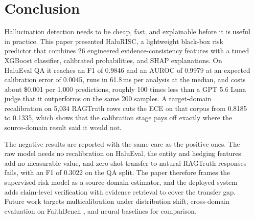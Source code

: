 \section{Conclusion}

Hallucination detection needs to be cheap, fast, and explainable before it is useful in practice. This paper presented HaluRISC, a lightweight black-box risk predictor that combines 26 engineered evidence-consistency features with a tuned XGBoost classifier, calibrated probabilities, and SHAP explanations. On HaluEval QA it reaches an F1 of 0.9846 and an AUROC of 0.9979 at an expected calibration error of 0.0045, runs in 61.8\,ms per analysis at the median, and costs about \$0.001 per 1{,}000 predictions, roughly 100 times less than a GPT 5.6 Luna judge that it outperforms on the same 200 samples. A target-domain recalibration on 5{,}034 RAGTruth rows cuts the ECE on that corpus from 0.8185 to 0.1335, which shows that the calibration stage pays off exactly where the source-domain result said it would not.

The negative results are reported with the same care as the positive ones. The raw model needs no recalibration on HaluEval, the entity and hedging features add no measurable value, and zero-shot transfer to natural RAGTruth responses fails, with an F1 of 0.3022 on the QA split. The paper therefore frames the supervised risk model as a source-domain estimator, and the deployed system adds claim-level verification with evidence retrieval to cover the transfer gap. Future work targets multicalibration under distribution shift, cross-domain evaluation on FaithBench \cite{faithbench}, and neural baselines for comparison.
